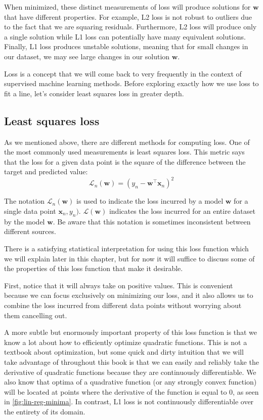 When minimized, these distinct measurements of loss will produce solutions for $\mathbf{w}$ that have different properties. For example, L2 loss is not robust to outliers due to the fact that we are squaring residuals. Furthermore, L2 loss will produce only a single solution while L1 loss can potentially have many equivalent solutions. Finally, L1 loss produces unstable solutions, meaning that for small changes in our dataset, we may see large changes in our solution $\mathbf{w}$.

Loss is a concept that we will come back to very frequently in the context of supervised machine learning methods. Before exploring exactly how we use loss to fit a line, let's consider least squares loss in greater depth.

\subsection{Least squares loss}
As we mentioned above, there are different methods for computing loss. One of the most commonly used measurements is least squares loss. This metric says that the loss for a given data point is the square of the difference between the target and predicted value:
\begin{equation}
    \label{eq:least-squares-loss-fn}
    \mathcal{L}_n(\mathbf{w}) = (y_n - \mathbf{w}^\top \mathbf{x}_n)^2
\end{equation}

\begin{warning}
    The notation $\mathcal{L}_n(\mathbf{w})$ is used to indicate the loss incurred by a model $\mathbf{w}$ for a single data point $\mathbf{x}_n, y_n)$. $\mathcal{L}(\mathbf{w})$ indicates the loss incurred for an entire dataset by the model $\mathbf{w}$. Be aware that this notation is sometimes inconsistent between different sources.
\end{warning}

There is a satisfying statistical interpretation for using this loss function which we will explain later in this chapter, but for now it will suffice to discuss some of the properties of this loss function that make it desirable.

First, notice that it will always take on positive values. This is convenient because we can focus exclusively on minimizing our loss, and it also allows us to combine the loss incurred from different data points without worrying about them cancelling out.

A more subtle but enormously important property of this loss function is that we know a lot about how to efficiently optimize quadratic functions. This is not a textbook about optimization, but some quick and dirty intuition that we will take advantage of throughout this book is that we can easily and reliably take the derivative of quadratic functions because they are continuously differentiable. We also know that optima of a quadrative function (or any strongly convex function) will be located at points where the derivative of the function is equal to 0, as seen in \autoref{fig:lin-reg-minima}. In contrast, L1 loss is not continuously differentiable over the entirety of its domain.

